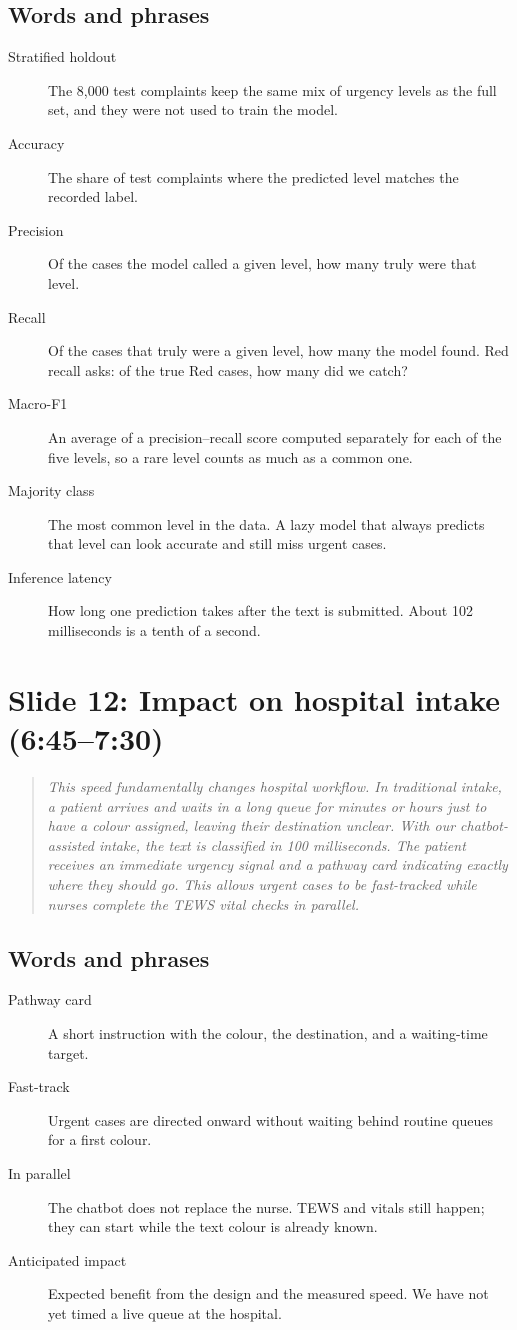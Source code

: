 \documentclass[11pt,a4paper]{article}
\newcommand{\say}[1]{\begin{quote}\itshape #1\end{quote}}
\newcommand{\terms}{\subsection*{Words and phrases}}
\begin{document}
\terms
\begin{description}
\item[Stratified holdout] The 8{,}000 test complaints keep the same mix of urgency levels as the full set, and they were not used to train the model.
\item[Accuracy] The share of test complaints where the predicted level matches the recorded label.
\item[Precision] Of the cases the model called a given level, how many truly were that level.
\item[Recall] Of the cases that truly were a given level, how many the model found. Red recall asks: of the true Red cases, how many did we catch?
\item[Macro-F1] An average of a precision--recall score computed separately for each of the five levels, so a rare level counts as much as a common one.
\item[Majority class] The most common level in the data. A lazy model that always predicts that level can look accurate and still miss urgent cases.
\item[Inference latency] How long one prediction takes after the text is submitted. About 102 milliseconds is a tenth of a second.
\end{description}

\section{Slide 12: Impact on hospital intake (6:45--7:30)}

\say{This speed fundamentally changes hospital workflow. In traditional intake, a patient arrives and waits in a long queue for minutes or hours just to have a colour assigned, leaving their destination unclear. With our chatbot-assisted intake, the text is classified in 100 milliseconds. The patient receives an immediate urgency signal and a pathway card indicating exactly where they should go. This allows urgent cases to be fast-tracked while nurses complete the TEWS vital checks in parallel.}

\terms
\begin{description}
\item[Pathway card] A short instruction with the colour, the destination, and a waiting-time target.
\item[Fast-track] Urgent cases are directed onward without waiting behind routine queues for a first colour.
\item[In parallel] The chatbot does not replace the nurse. TEWS and vitals still happen; they can start while the text colour is already known.
\item[Anticipated impact] Expected benefit from the design and the measured speed. We have not yet timed a live queue at the hospital.
\end{description}
\end{document}
